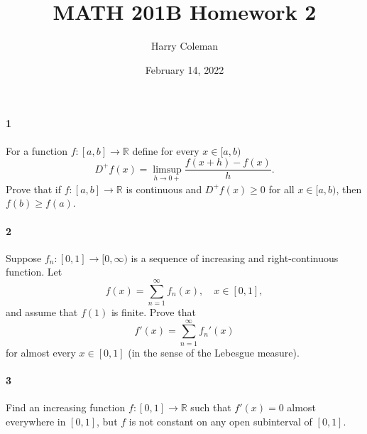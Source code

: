 \documentclass[12pt]{article}
\renewcommand{\maketitle}{\thispagestyle{title}}
\newlength{\myparskip}
\newenvironment{fullbox}{\begin{lrbox}{\savefullbox}\begin{minipage}{\dimexpr\textwidth-2\fboxsep\relax}\setlength{\parskip}{\myparskip}}{\end{minipage}\end{lrbox}\framebox[\textwidth]{\usebox{\savefullbox}}}
\newenvironment{pbox}[1][]{\begin{fullbox}\ifx#1\empty\else\paragraph{#1}\phantom{}\fi}{\end{fullbox}}
\theoremstyle{definition}
\newcommand{\R}{\mathbb{R}}
\newcommand{\<}{\langle}
\renewcommand{\>}{\rangle}
\begin{document}
\title{MATH 201B Homework 2}
\author{Harry Coleman}
\date{February 14, 2022}
\maketitle

\begin{pbox}[1]
    For a function $f : [a, b] \to \R$ define for every $x \in [a, b)$
    \[
        D^+ f(x) = \limsup_{h \to 0+} \frac{f(x + h) - f(x)}{h}.
    \]
    Prove that if $f : [a, b] \to \R$ is continuous and $D^+ f(x) \geq 0$ for all $x \in [a, b)$, then $f(b) \geq f(a)$.
\end{pbox}

\begin{pbox}[2]
    Suppose $f_n : [0, 1] \to [0, \infty)$ is a sequence of increasing and right-continuous function.
    Let
    \[
        f(x) = \sum_{n=1}^{\infty} f_n(x), \quad x \in [0, 1],
    \]
    and assume that $f(1)$ is finite.
    Prove that
    \[
        f'(x) = \sum_{n=1}^{\infty} f_n'(x)
    \]
    for almost every $x \in [0, 1]$ (in the sense of the Lebesgue measure).
\end{pbox}

\begin{pbox}[3]
    Find an increasing function $f : [0, 1] \to \R$ such that $f'(x) = 0$ almost everywhere in $[0, 1]$, but $f$ is not constant on any open subinterval of $[0, 1]$.
\end{pbox}
\end{document}
